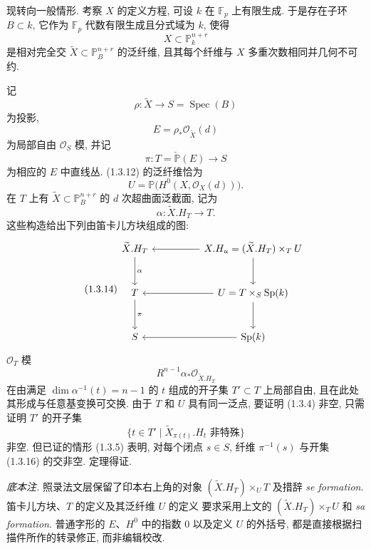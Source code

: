\par\medskip
现转向一般情形. 考察 $X$ 的定义方程, 可设 $k$ 在 $\mathbb F_p$ 上有限生成.
于是存在子环 $B\subset k$, 它作为 $\mathbb F_p$ 代数有限生成且分式域为 $k$, 使得
\begin{equation}\tag{1.3.9}
X\subset\mathbb P_k^{n+r}
\end{equation}
是相对完全交 $\widetilde X\subset\mathbb P_B^{n+r}$ 的泛纤维,
且其每个纤维与 $X$ 多重次数相同并几何不可约.

记
\begin{equation}\tag{1.3.10}
\rho:\widetilde X\longrightarrow S=\operatorname{Spec}(B)
\end{equation}
为投影,
\begin{equation}\tag{1.3.11}
E=\rho_*\mathcal O_{\widetilde X}(d)
\end{equation}
为局部自由 $\mathcal O_S$ 模, 并记
\begin{equation}\tag{1.3.12}
\pi:T=\check{\mathbb P}(E)\longrightarrow S
\end{equation}
为相应的 $E$ 中直线丛. (1.3.12) 的泛纤维恰为
\[
U=\mathbb P\bigl(H^0(X,\mathcal O_X(d))\bigr).
\]
在 $T$ 上有 $\widetilde X\subset\mathbb P_B^{n+r}$ 的 $d$ 次超曲面泛截面, 记为
\begin{equation}\tag{1.3.13}
\alpha:\widetilde X.H_T\longrightarrow T.
\end{equation}
这些构造给出下列由笛卡儿方块组成的图:
\begin{equation}\tag{1.3.14}
\begin{tikzcd}[column sep=huge,row sep=large]
\widetilde X.H_T \arrow[d,"\alpha"]
  & X.H_u=(\widetilde X.H_T)\times_T U \arrow[l]\arrow[d] \\
T \arrow[d,"\pi"]
  & U=T\times_S\operatorname{Sp}(k) \arrow[l]\arrow[d] \\
S & \operatorname{Sp}(k)\arrow[l]
\end{tikzcd}
\end{equation}
$\mathcal O_T$ 模
\begin{equation}\tag{1.3.15}
R^{n-1}\alpha_*\mathcal O_{\widetilde X.H_T}
\end{equation}
在由满足 $\dim\alpha^{-1}(t)=n-1$ 的 $t$ 组成的开子集 $T'\subset T$ 上局部自由,
且在此处其形成与任意基变换可交换. 由于 $T$ 和 $U$ 具有同一泛点,
要证明 (1.3.4) 非空, 只需证明 $T'$ 的开子集
\begin{equation}\tag{1.3.16}
\bigl\{t\in T'\mid\widetilde X_{\pi(t)}.H_t
   \text{ 非特殊}\bigr\}
\end{equation}
非空. 但已证的情形 (1.3.5) 表明, 对每个闭点 $s\in S$, 纤维 $\pi^{-1}(s)$
与开集 (1.3.16) 的交非空. 定理得证.

\medskip
\noindent\emph{底本注.}
照录法文层保留了印本右上角的对象 $(\widetilde X.H_T)\times_U T$
及措辞 \emph{se formation}. 笛卡儿方块、$T$ 的定义及其泛纤维 $U$ 的定义
要求采用上文的 $(\widetilde X.H_T)\times_T U$ 和 \emph{sa formation}.
普通字形的 $E$、$H^0$ 中的指数 $0$ 以及定义 $U$ 的外括号,
都是直接根据扫描件所作的转录修正, 而非编辑校改.
